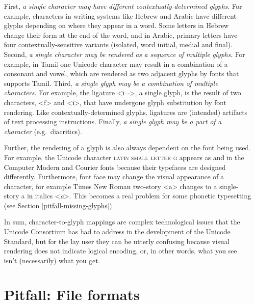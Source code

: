 First, \textit{a single character may have different contextually determined
glyphs.} For example, characters in writing systems like Hebrew and Arabic have
different glyphs depending on where they appear in a word. Some letters in
Hebrew change their form at the end of the word, and in Arabic, primary letters
have four contextually-sensitive variants (isolated, word initial, medial and
final). Second, \textit{a single character may be rendered as a sequence of
multiple glyphs.} For example, in Tamil one Unicode character may result in a
combination of a consonant and vowel, which are rendered as two adjacent glyphs
by fonts that supports Tamil. Third, \textit{a single glyph may be a combination
of multiple characters.} For example, the ligature <ï¬>, a single glyph, is the
result of two characters, <f> and <i>, that have undergone glyph substitution by
font rendering. Like contextually-determined glyphs, ligatures are (intended)
artifacts of text processing instructions. Finally, \textit{a single glyph may
be a part of a character} (e.g.~diacritics).

Further, the rendering of a glyph is also always dependent on the font being
used. For example, the Unicode character \textsc{latin small letter g} appears
as and in the Computer Modern and Courier fonts because their typefaces are
designed differently. Furthermore, font face may change the visual appearance of
a character, for example Times New Roman two-story <a> changes to a single-story
a in italics <\emph{a}>. This becomes a real problem for some phonetic
typesetting (see Section \ref{pitfall-missing-glyphs}).

In sum, character-to-glyph mappings are complex technological issues that the
Unicode Consortium has had to address in the development of the Unicode
Standard, but for the lay user they can be utterly confusing because visual
rendering does not indicate logical encoding, or, in other words, what you see
isn't (necessarily) what you get.

\section{Pitfall: File formats} \label{pitfall-file-formats}

